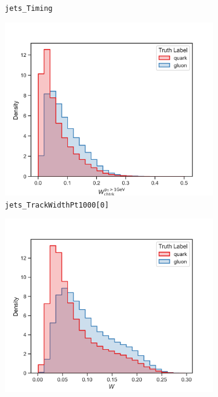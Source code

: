 \begin{figure}[!htb]
\begin{subfigure}[t]{0.48\textwidth}
		\caption{\texttt{jets\_Timing}}
		\label{fig:highlevel_19}
	\end{subfigure}
	\begin{subfigure}[t]{0.48\textwidth}
		\includegraphics[width=1\textwidth]{src/plots/distributions/highlevel/jets_TrackWidthPt1000[0].png}
		\caption{\texttt{jets\_TrackWidthPt1000[0]}}
		\label{fig:highlevel_20}
	\end{subfigure}
	\begin{subfigure}[t]{0.48\textwidth}
		\includegraphics[width=1\textwidth]{src/plots/distributions/highlevel/jets_Width.png}

\end{subfigure}
\end{figure}
